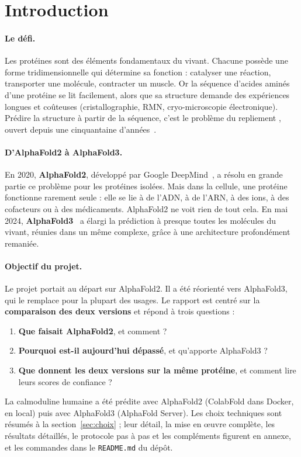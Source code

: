 \section{Introduction}

\paragraph{Le défi.} Les protéines sont des éléments fondamentaux du vivant. Chacune possède une forme tridimensionnelle qui détermine sa fonction : catalyser une réaction, transporter une molécule, contracter un muscle. Or la séquence d'acides aminés d'une protéine se lit facilement, alors que sa structure demande des expériences longues et coûteuses (cristallographie, RMN, cryo-microscopie électronique). Prédire la structure à partir de la séquence, c'est le \og problème du repliement \fg{}, ouvert depuis une cinquantaine d'années~\cite{ebi_course}.

\paragraph{D'AlphaFold2 à AlphaFold3.} En 2020, \textbf{AlphaFold2}, développé par Google DeepMind~\cite{jumper2021}, a résolu en grande partie ce problème pour les protéines isolées. Mais dans la cellule, une protéine fonctionne rarement seule : elle se lie à de l'ADN, à de l'ARN, à des ions, à des cofacteurs ou à des médicaments. AlphaFold2 ne voit rien de tout cela. En mai 2024, \textbf{AlphaFold3}~\cite{abramson2024} a élargi la prédiction à presque toutes les molécules du vivant, réunies dans un même complexe, grâce à une architecture profondément remaniée.

\paragraph{Objectif du projet.} Le projet portait au départ sur AlphaFold2. Il a été réorienté vers AlphaFold3, qui le remplace pour la plupart des usages. Le rapport est centré sur la \textbf{comparaison des deux versions} et répond à trois questions :
\begin{enumerate}
  \item \textbf{Que faisait AlphaFold2}, et comment ?
  \item \textbf{Pourquoi est-il aujourd'hui dépassé}, et qu'apporte AlphaFold3 ?
  \item \textbf{Que donnent les deux versions sur la même protéine}, et comment lire leurs scores de confiance ?
\end{enumerate}
La calmoduline humaine a été prédite avec AlphaFold2 (ColabFold dans Docker, en local) puis avec AlphaFold3 (AlphaFold Server). Les choix techniques sont résumés à la section~\ref{sec:choix} ; leur détail, la mise en œuvre complète, les résultats détaillés, le protocole pas à pas et les compléments figurent en annexe, et les commandes dans le \texttt{README.md} du dépôt.

